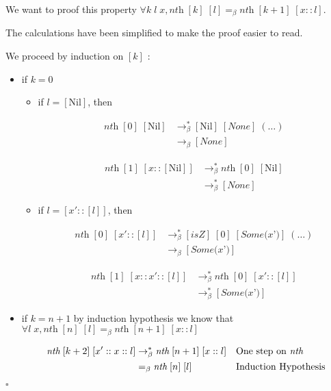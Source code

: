 \documentclass{article}
\theoremstyle{plain}
\renewcommand\qedsymbol{$\square$}
\newcommand{\rbeta}{\to_\beta}
\newcommand{\rsbeta}{\to_\beta^*}
\newcommand{\nil}{[\text{Nil}]}
\newcommand{\nth}{\textit{nth}}
\newcommand{\none}{[\textit{None}]}
\begin{document}
\newpage

  We want to proof this property $\forall k\;l\;x, \textit{nth}\; [k]\; [l]
  =_\beta \textit{nth}\;[k+1]\;[x :: l]$.

  \proof
  The calculations have been simplified to
  make the proof easier to read.

  We proceed by induction on $[k]$ :

  \begin{itemize}
    \item if $ k = 0$
      \begin{itemize}
        \item if $l = \nil$, then 
          \begin{multicols}{2}
          \begin{align*}
            \nth\; [0]\; \nil &\rsbeta \nil\; \none\; (\ldots) \\
                              &\rbeta \none
          \end{align*}

          \begin{align*}
            \nth\; [1]\; [x::\nil] &\rsbeta \nth\;[0]\;\nil \\
                                   &\rsbeta \none
          \end{align*}
          \end{multicols}

        \item if $l = [x' :: [l]]$, then
          \begin{multicols}{2}
          \begin{align*}
            \nth\; [0]\; [x'::[l]] &\rsbeta
                              [\textit{isZ}]\; [0]\; [\textit{Some(x')}]\;
                              (\ldots) \\
                              &\rbeta [\textit{Some(x')}]
          \end{align*}

          \begin{align*}
            \nth\; [1]\; [x::x'::[l]] &\rsbeta
                              \nth\; [0]\; [x' :: [l]] \\
                              &\rsbeta [\textit{Some(x')}]
          \end{align*}
          \end{multicols}
      \end{itemize}
    \item if $k = n + 1$ by induction hypothesis we know that 
      $\forall l\;x, \nth\; [n]\; [l] =_\beta \nth\;[n+1]\;[x :: l]$

      \begin{align*}
        \nth\; [k + 2]\;[x'::x:: l] &\rsbeta \nth\;[n+1]\;[x::l] & &\text{One
        step on \nth} \\
        &=_\beta \nth\;[n]\;[l] & &\text{Induction Hypothesis}
      \end{align*}
  \end{itemize}
  \qedsymbol
\end{document}
